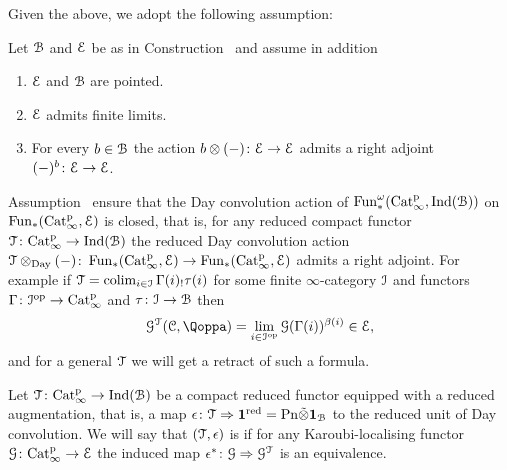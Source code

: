 Given the above, we adopt the following assumption:

\begin{assumption}
\label{assumption:cotensor}%
Let $\mathcal{B}$ and $\mathcal{E}$ be as in Construction~ and assume in addition
\begin{enumerate}
\item
$\mathcal{E}$ and $\mathcal{B}$ are pointed.
\item
$\mathcal{E}$ admits finite limits.
\item
For every $b \in \mathcal{B}$ the action $b\otimes(-)\colon \mathcal{E} \to \mathcal{E}$ admits a right adjoint $(-)^b\colon \mathcal{E} \to \mathcal{E}$.
\end{enumerate}
\end{assumption}

Assumption~ ensure that the Day convolution action of $\operatorname{Fun}^{\omega}_{\ast}(\mathrm{Cat}^{\mathrm p}_\infty,\operatorname{Ind}(\mathcal{B}))$ on $\operatorname{Fun}_{\ast}(\mathrm{Cat}^{\mathrm p}_\infty,\mathcal{E})$ is closed, that is, for any reduced compact functor $\mathcal{T}\colon \mathrm{Cat}^{\mathrm p}_\infty \to \operatorname{Ind}(\mathcal{B})$ the reduced Day convolution action $\mathcal{T}\otimes_{\mathrm{Day}}(-)\colon \operatorname{Fun}_{\ast}(\mathrm{Cat}^{\mathrm p}_\infty,\mathcal{E}) \to \operatorname{Fun}_{\ast}(\mathrm{Cat}^{\mathrm p}_\infty,\mathcal{E})$ admits a right adjoint. 
For example if $\mathcal{T} = \mathop{\mathrm{colim}}_{i \in \mathcal{I}}\Gamma(i)_!\tau(i)$ for some finite $\infty$-category $\mathcal{I}$ and functors $\Gamma\colon \mathcal{I}^\mathrm{op} \to \mathrm{Cat}^{\mathrm p}_\infty$ and $\tau\colon \mathcal{I} \to \mathcal{B}$ then 
\[
\G^{\T}(\C,\QF) = \lim_{i \in \I\op}\G(\Gamma(i))^{\bet(i)} \in \E,
\]
and for a general $\mathcal{T}$ we will get a retract of such a formula.

\begin{definition}
Let $\mathcal{T}\colon \mathrm{Cat}^{\mathrm p}_\infty \to \operatorname{Ind}(\mathcal{B})$ be a compact reduced functor equipped with a reduced augmentation, that is, a map $\epsilon\colon \mathcal{T} \Rightarrow \mathbf{1}^{\mathrm{red}} =  \mathrm{Pn}\tilde{\otimes} \mathbf{1}_{\mathcal{B}}$ to the reduced unit of Day convolution. We will say that $(\mathcal{T},\epsilon)$ is  if for any Karoubi-localising functor $\mathcal{G}\colon \mathrm{Cat}^{\mathrm p}_\infty \to \mathcal{E}$ the induced map $\epsilon^*\colon \mathcal{G} \Rightarrow \mathcal{G}^{\mathcal{T}}$ is an equivalence. 
\end{definition}



